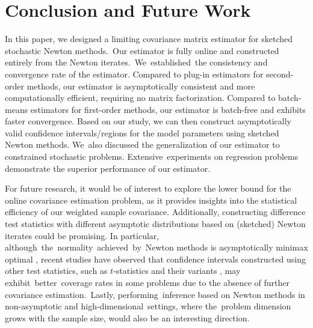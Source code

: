 
\section{Conclusion and Future Work}\label{sec:6}

In this paper, we designed a limiting covariance matrix estimator for sketched stochastic Newton methods.~Our estimator is fully online and constructed entirely from the Newton iterates.~We~\mbox{established}~the consistency and convergence rate of the estimator. Compared to plug-in estimators for \mbox{second-order} methods, our estimator is asymptotically consistent and more computationally efficient, \mbox{requiring} no matrix factorization. Compared to batch-means estimators for first-order methods, our \mbox{estimator} is batch-free and exhibits faster convergence. Based on our study, we can then construct asymptotically valid confidence intervals/regions for the model parameters using sketched Newton methods. We~also discussed the generalization of our estimator to constrained stochastic problems. Extensive~experiments on regression problems demonstrate the superior performance of our estimator.



For future research, it would be of interest to explore the lower bound for the online \mbox{covariance} estimation problem, as it provides insights into the statistical efficiency of our weighted sample covariance. Additionally, constructing difference test statistics with different asymptotic distributions based on (sketched) Newton iterates could be promising. In particular, although~the~\mbox{normality}~achieved~by~Newton methods is asymptotically minimax optimal \citep{Na2022Statistical}, recent studies have observed that confidence intervals constructed using other test statistics, such as $t$-statistics \citep{Zhu2024High} and their variants \citep{Lee2022Fast, Luo2022Covariance, Chen2024Online}, may exhibit~\mbox{better}~coverage rates in some problems due to the absence of further covariance estimation.~Lastly, \mbox{performing}~inference based on Newton methods in non-asymptotic and \mbox{high-dimensional}~settings, where the~problem dimension grows with the sample size, would also be an interesting direction.


